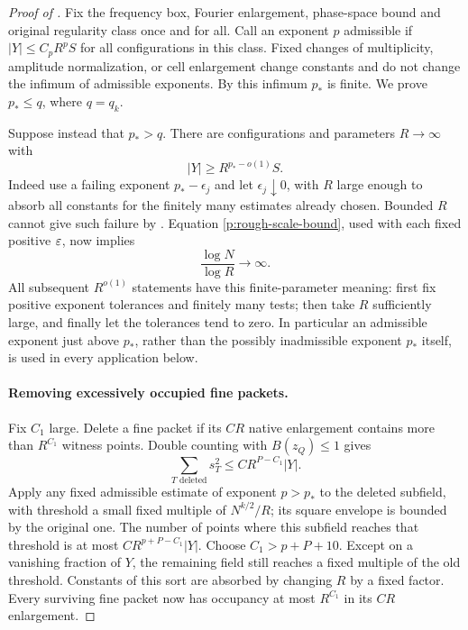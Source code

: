 \begin{proof}[Proof of ]
Fix the frequency box, Fourier enlargement, phase-space bound and original
regularity class once and for all.  Call an exponent $p$ admissible if
$|Y|\leq C_pR^pS$ for all configurations in this class.  Fixed changes of
multiplicity, amplitude normalization, or cell enlargement change constants
and do not change the infimum of admissible exponents.  By
 this infimum $p_*$ is finite.  We prove $p_*\leq q$,
where $q=q_k$.

Suppose instead that $p_*>q$.  There are configurations and parameters
$R\to\infty$ with
\begin{equation}\label{p:extremal-sequence}
 |Y|\geq R^{p_*-o(1)}S.
\end{equation}
Indeed use a failing exponent $p_*-\epsilon_j$ and let
$\epsilon_j\downarrow0$, with $R$ large enough to absorb all constants for
the finitely many estimates already chosen.  Bounded $R$ cannot give such
failure by .  Equation \eqref{p:rough-scale-bound},
used with each fixed positive $\varepsilon$, now implies
\begin{equation}\label{p:scale-separation}
 \frac{\log N}{\log R}\longrightarrow\infty.
\end{equation}
All subsequent $R^{o(1)}$ statements have this finite-parameter meaning:
first fix positive exponent tolerances and finitely many tests; then take
$R$ sufficiently large, and finally let the tolerances tend to zero.
In particular an admissible exponent just above $p_*$, rather than the
possibly inadmissible exponent $p_*$ itself, is used in every application
below.

\paragraph{Removing excessively occupied fine packets.}
Fix $C_1$ large.  Delete a fine packet if its $CR$ native enlargement contains
more than $R^{C_1}$ witness points.  Double counting with $B(z_Q)\leq1$ gives
\[
 \sum_{T\text{ deleted}}s_T^2
 \leq C R^{P-C_1}|Y|.
\]
Apply any fixed admissible estimate of exponent $p>p_*$ to the deleted
subfield, with threshold a small fixed multiple of $N^{k/2}/R$; its square
envelope is bounded by the original one.  The number of points where this
subfield reaches that threshold is at most
$C R^{p+P-C_1}|Y|$.  Choose $C_1>p+P+10$.
Except on a vanishing fraction of $Y$, the remaining field still reaches a
fixed multiple of the old threshold.  Constants of this sort are absorbed
by changing $R$ by a fixed factor.  Every surviving fine packet now has
occupancy at most $R^{C_1}$ in its $CR$ enlargement.


\end{proof}
